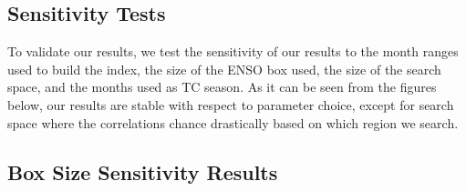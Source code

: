 \documentclass[]{article}
\begin{document}

\subsection{Sensitivity Tests}
To validate our results, we test the sensitivity of our results to the month ranges used to build the index, the size of the ENSO box used, the size of the search space, and the months used as TC season. As it can be seen from the figures below, our results are stable with respect to parameter choice, except for search space where the correlations chance drastically based on which region we search.
\subsection{Box Size Sensitivity Results}
\end{document}
